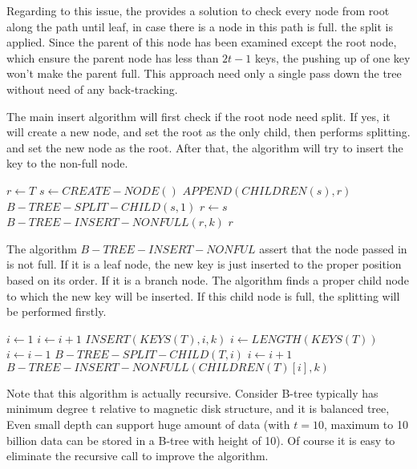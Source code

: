 \documentclass{article}
\begin{document}
Regarding to this issue, the \cite{CLRS} provides a solution to check
every node from root along the path until leaf, in case there is a
node in this path is full. the split is applied. Since the parent
of this node has been examined except the root node, which ensure
the parent node has less than $2t-1$ keys, the pushing up of one
key won't make the parent full. This approach need only a single
pass down the tree without need of any back-tracking.

The main insert algorithm will first check if the root node need
split. If yes, it will create a new node, and set the root as the
only child, then performs splitting. and set the new node as the
root. After that, the algorithm will try to insert the key to the
non-full node.

\begin{algorithmic}[1]
  \State $r \leftarrow T$
    \State $s \leftarrow CREATE-NODE()$
    \State $APPEND(CHILDREN(s), r)$
    \State $B-TREE-SPLIT-CHILD(s, 1)$
    \State $r \leftarrow s$
  \EndIf
  \State $B-TREE-INSERT-NONFULL(r, k)$
  \State \Return $r$
\EndFunction
\end{algorithmic}

The algorithm $B-TREE-INSERT-NONFUL$ assert that the node passed in
is not full. If it is a leaf node, the new key is just inserted to
the proper position based on its order. If it is a branch node. The algorithm
finds a proper child node to which the new key will be inserted.
If this child node is full, the splitting will be performed firstly.

\begin{algorithmic}[1]
    \State $i \leftarrow 1$
      \State $i \leftarrow i+1$
    \EndWhile
    \State $INSERT(KEYS(T), i, k)$
  \Else
    \State $i \leftarrow LENGTH(KEYS(T))$
      \State $i \leftarrow i-1$
    \EndWhile
      \State $B-TREE-SPLIT-CHILD(T, i)$
        \State $i \leftarrow i+1$
      \EndIf
    \EndIf
    \State $B-TREE-INSERT-NONFULL(CHILDREN(T)[i], k)$
  \EndIf
\EndProcedure
\end{algorithmic}

Note that this algorithm is actually recursive. Consider B-tree typically
has minimum degree t relative to magnetic disk structure, and it is balanced
tree, Even small depth can support huge amount of data
(with $t=10$, maximum to 10 billion data can be stored in a B-tree with height of 10).
Of course it is easy to eliminate the recursive call to improve the algorithm.
\end{document}
